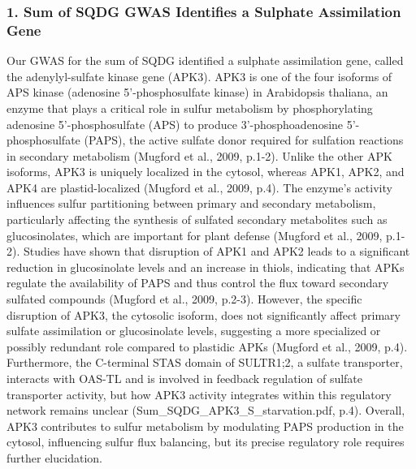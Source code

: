\documentclass[10pt,letterpaper]{article}
\begin{document}
\begin{itemize}
\subsubsection*{1. Sum of SQDG GWAS Identifies a Sulphate Assimilation Gene}
Our GWAS for the sum of SQDG identified a sulphate assimilation gene, called the adenylyl-sulfate kinase gene (APK3). APK3 is one of the four isoforms of APS kinase (adenosine 5'-phosphosulfate kinase) in Arabidopsis thaliana, an enzyme that plays a critical role in sulfur metabolism by phosphorylating adenosine 5'-phosphosulfate (APS) to produce 3'-phosphoadenosine 5'-phosphosulfate (PAPS), the active sulfate donor required for sulfation reactions in secondary metabolism (Mugford et al., 2009, p.1-2). Unlike the other APK isoforms, APK3 is uniquely localized in the cytosol, whereas APK1, APK2, and APK4 are plastid-localized (Mugford et al., 2009, p.4). The enzyme's activity influences sulfur partitioning between primary and secondary metabolism, particularly affecting the synthesis of sulfated secondary metabolites such as glucosinolates, which are important for plant defense (Mugford et al., 2009, p.1-2). Studies have shown that disruption of APK1 and APK2 leads to a significant reduction in glucosinolate levels and an increase in thiols, indicating that APKs regulate the availability of PAPS and thus control the flux toward secondary sulfated compounds (Mugford et al., 2009, p.2-3). However, the specific disruption of APK3, the cytosolic isoform, does not significantly affect primary sulfate assimilation or glucosinolate levels, suggesting a more specialized or possibly redundant role compared to plastidic APKs (Mugford et al., 2009, p.4). Furthermore, the C-terminal STAS domain of SULTR1;2, a sulfate transporter, interacts with OAS-TL and is involved in feedback regulation of sulfate transporter activity, but how APK3 activity integrates within this regulatory network remains unclear (Sum\_SQDG\_APK3\_S\_starvation.pdf, p.4). Overall, APK3 contributes to sulfur metabolism by modulating PAPS production in the cytosol, influencing sulfur flux balancing, but its precise regulatory role requires further elucidation.





\end{itemize}
\end{document}
